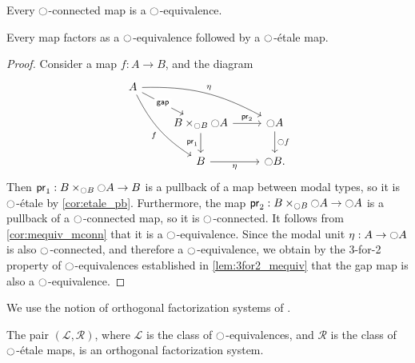 \documentclass[9pt,twosided]{amsart}
\begin{document}
\begin{cor}\label{cor:mequiv_mconn}
Every ${\ocircle}$-connected map is a ${\ocircle}$-equivalence.
\end{cor}

\begin{lem}\label{lem:rfs_factor}
Every map factors as a ${\ocircle}$-equivalence followed by a ${\ocircle}$-\'etale map.
\end{lem}

\begin{proof}
Consider a map $f:A\to B$, and the diagram
\begin{equation*}
\begin{tikzcd}
A \arrow[ddr,bend right=15,swap,"f"] \arrow[drr,bend left=15,"\modalunit"] \arrow[dr,"\mathsf{gap}" description] \\
& B\times_{\modal B} \modal A \arrow[d,swap,"\proj 1"] \arrow[r,"\proj 2"] & \modal A \arrow[d,"\modal f"] \\
& B \arrow[r,swap,"\modalunit"] & \modal B.
\end{tikzcd}
\end{equation*}
Then $\mathsf{pr}_{1}:B\times_{{\ocircle} B} {\ocircle} A\to B$ is a pullback of a map between modal types, so it is ${\ocircle}$-\'etale by \cref{cor:etale_pb}. Furthermore, the map $\mathsf{pr}_{2}:B\times_{{\ocircle} B}{\ocircle} A\to {\ensuremath{\ocircle}} A$ is a pullback of a ${\ocircle}$-connected map, so it is ${\ocircle}$-connected. It follows from \cref{cor:mequiv_mconn} that it is a ${\ocircle}$-equivalence. Since the modal unit ${\eta_{}} :A\to{\ensuremath{\ocircle}} A$ is also ${\ocircle}$-connected, and therefore a ${\ocircle}$-equivalence, we obtain by the 3-for-2 property of ${\ocircle}$-equivalences established in \cref{lem:3for2_mequiv} that the gap map is also a ${\ocircle}$-equivalence.
\end{proof}

We use the notion of orthogonal factorization systems of \cite{RijkeSpittersShulman}.

\begin{thm}\label{thm:rfs_orthogonal}
  The pair $(\mathcal{L},\mathcal{R})$, where $\mathcal{L}$ is the class of ${\ocircle}$-equivalences, and $\mathcal{R}$ is the class of ${\ocircle}$-\'etale maps, is an orthogonal factorization system.
\end{thm}
\end{document}
